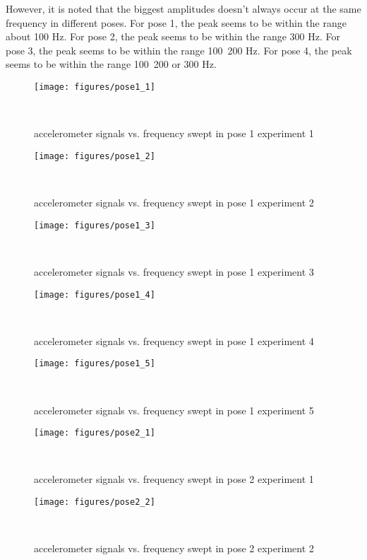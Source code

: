\documentclass{sigchi}
\begin{document}
However, it is noted that the biggest amplitudes doesn't always occur at the same frequency in different poses. For pose 1, the peak seems to be within the range about 100 Hz. For pose 2, the peak seems to be within the range 300 Hz. For pose 3, the peak seems to be within the range 100~200 Hz. For pose 4, the peak seems to be within the range 100~200 or 300 Hz.

\begin{figure*}
  \centering
  \texttt{[image: figures/pose1\_1]}
  \caption{accelerometer signals vs. frequency swept in pose 1 experiment 1}
    ~\label{fig:pose1_1}
\end{figure*}

\begin{figure*}
  \centering
  \texttt{[image: figures/pose1\_2]}
  \caption{accelerometer signals vs. frequency swept in pose 1 experiment 2}
    ~\label{fig:pose1_2}
\end{figure*}

\begin{figure*}
  \centering
  \texttt{[image: figures/pose1\_3]}
  \caption{accelerometer signals vs. frequency swept in pose 1 experiment 3}
    ~\label{fig:pose1_3}
\end{figure*}

\begin{figure*}
  \centering
  \texttt{[image: figures/pose1\_4]}
  \caption{accelerometer signals vs. frequency swept in pose 1 experiment 4}
    ~\label{fig:pose1_4}
\end{figure*}

\begin{figure*}
  \centering
  \texttt{[image: figures/pose1\_5]}
  \caption{accelerometer signals vs. frequency swept in pose 1 experiment 5}
    ~\label{fig:pose1_5}
\end{figure*}

\begin{figure*}
  \centering
  \texttt{[image: figures/pose2\_1]}
  \caption{accelerometer signals vs. frequency swept in pose 2 experiment 1}
    ~\label{fig:pose2_1}
\end{figure*}

\begin{figure*}
  \centering
  \texttt{[image: figures/pose2\_2]}
  \caption{accelerometer signals vs. frequency swept in pose 2 experiment 2}
    ~\label{fig:pose2_2}
\end{figure*}
\end{document}
